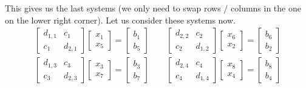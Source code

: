 \documentclass{article}
\begin{document}
This gives us the last systems (we only need to swap rows / columns in the one on the lower right corner). Let us consider these systems now.
\begin{align*}
    \begin{bmatrix}
        d_{1,1} & c_{1} \\
        c_{1} & d_{2,1}
    \end{bmatrix} \begin{bmatrix}
        x_{1} \\ x_{5}
    \end{bmatrix} = \begin{bmatrix}
        b_{1} \\ b_{5}
    \end{bmatrix}
    \qquad \begin{bmatrix}
        d_{2,2} & c_{2} \\
        c_{2} & d_{1,2}
    \end{bmatrix}\begin{bmatrix}
        x_{6} \\ x_{2}
    \end{bmatrix} = \begin{bmatrix}
        b_{6} \\ b_{2}
    \end{bmatrix} \\[2mm]
    \begin{bmatrix}
        d_{1,3} & c_{3} \\
        c_{3} & d_{2,3}
    \end{bmatrix}\begin{bmatrix}
        x_{3} \\ x_{7}
    \end{bmatrix} = \begin{bmatrix}
        b_{3} \\ b_{7}
    \end{bmatrix} \qquad \begin{bmatrix}
        d_{2,4} & c_{4} \\
        c_{4} & d_{1,4}
    \end{bmatrix}\begin{bmatrix}
        x_{8} \\ x_{4} 
    \end{bmatrix} = \begin{bmatrix}
        b_{8} \\ b_{4}
    \end{bmatrix}
\end{align*}
\end{document}
